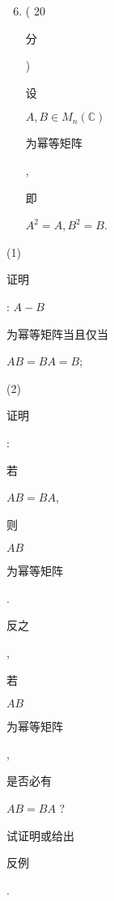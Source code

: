 \documentclass[10pt]{article}
\begin{document}
\begin{enumerate}
  \setcounter{enumi}{5}
  \item ( 20 \begin{CJK}{UTF8}{mj}分\end{CJK}) \begin{CJK}{UTF8}{mj}设\end{CJK} $A, B \in M_{n}(\mathbb{C})$ \begin{CJK}{UTF8}{mj}为幂等矩阵\end{CJK}, \begin{CJK}{UTF8}{mj}即\end{CJK} $A^{2}=A, B^{2}=B$.
\end{enumerate}
(1) \begin{CJK}{UTF8}{mj}证明\end{CJK}: $A-B$ \begin{CJK}{UTF8}{mj}为幂等矩阵当且仅当\end{CJK} $A B=B A=B$;

(2) \begin{CJK}{UTF8}{mj}证明\end{CJK}: \begin{CJK}{UTF8}{mj}若\end{CJK} $A B=B A$, \begin{CJK}{UTF8}{mj}则\end{CJK} $A B$ \begin{CJK}{UTF8}{mj}为幂等矩阵\end{CJK}. \begin{CJK}{UTF8}{mj}反之\end{CJK}, \begin{CJK}{UTF8}{mj}若\end{CJK} $A B$ \begin{CJK}{UTF8}{mj}为幂等矩阵\end{CJK}, \begin{CJK}{UTF8}{mj}是否必有\end{CJK} $A B=B A$ ? \begin{CJK}{UTF8}{mj}试证明或给出\end{CJK} \begin{CJK}{UTF8}{mj}反例\end{CJK}.
\end{document}
